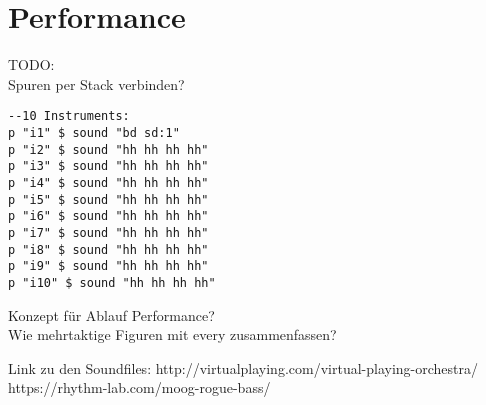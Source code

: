 \documentclass[
10pt, %
a4paper, %
oneside, %
headinclude,footinclude, %
BCOR5mm, %
]{scrartcl}
\begin{document}
\section{Performance}
TODO:\\
Spuren per Stack verbinden?\\

\begin{lstlisting}
--10 Instruments:
p "i1" $ sound "bd sd:1"
p "i2" $ sound "hh hh hh hh"
p "i3" $ sound "hh hh hh hh"
p "i4" $ sound "hh hh hh hh"
p "i5" $ sound "hh hh hh hh"
p "i6" $ sound "hh hh hh hh"
p "i7" $ sound "hh hh hh hh"
p "i8" $ sound "hh hh hh hh"
p "i9" $ sound "hh hh hh hh"
p "i10" $ sound "hh hh hh hh"
\end{lstlisting}
Konzept für Ablauf Performance?\\
Wie mehrtaktige Figuren mit every zusammenfassen?

Link zu den Soundfiles: http://virtualplaying.com/virtual-playing-orchestra/ \\
https://rhythm-lab.com/moog-rogue-bass/

\pagebreak


\renewcommand{\refname}{\spacedlowsmallcaps{Literatur/Quellen}} %




\end{document}
